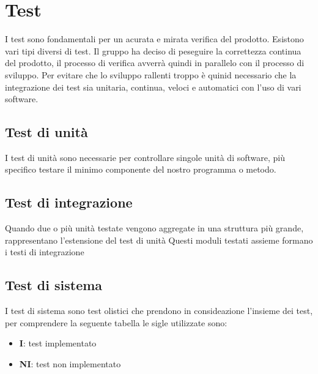 \section{Test}
I test sono fondamentali per un acurata e mirata verifica del prodotto. Esistono vari tipi diversi di test.
Il gruppo ha deciso di peseguire la correttezza continua del prodotto, il processo di verifica avverrà quindi in parallelo
con il processo di sviluppo. Per evitare che lo sviluppo rallenti troppo è quinid necessario che la integrazione dei test sia unitaria, continua,
veloci e automatici con l'uso di vari software.
%
%
\subsection{Test di unità}
I test di unità sono necessarie per controllare singole unità di software, più specifico testare il minimo componente del nostro
programma o metodo.
\subsection{Test di integrazione}
Quando due o più unità testate vengono aggregate in una struttura più grande, rappresentano l'estensione del test di unità
Questi moduli testati assieme formano i testi di integrazione
\subsection{Test di sistema}
I test di sistema sono test olistici che prendono in consideazione l'insieme dei test, per comprendere la seguente
tabella le sigle utilizzate sono:
\begin{itemize}
    \item \textbf{I}: test implementato
    \item \textbf{NI}: test non implementato
\end{itemize}
\newpage


